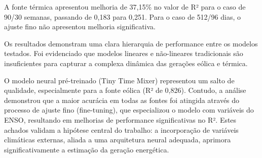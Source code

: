 A fonte térmica apresentou melhoria de 37,15\% no valor de R² para o caso de 90/30 semanas, passando de 0,183 para 0,251.
Para o caso de 512/96 dias, o ajuste fino não apresentou melhoria significativa. 

Os resultados demonstram uma clara hierarquia de performance entre os modelos testados. Foi evidenciado que modelos 
lineares e não-lineares tradicionais são insuficientes para capturar a complexa dinâmica das gerações eólica e térmica. 

O modelo neural pré-treinado (Tiny Time Mixer) representou um salto de qualidade, especialmente para a fonte eólica 
(R² de 0,826). Contudo, a análise demonstrou que a maior acurácia em todas as fontes foi atingida através do processo 
de ajuste fino (fine-tuning), que especializou o modelo com variáveis do ENSO, resultando em melhorias de performance 
significativas no R². Estes achados validam a hipótese central do trabalho: a incorporação de variáveis 
climáticas externas, aliada a uma arquitetura neural adequada, aprimora significativamente a estimação da geração energética.
